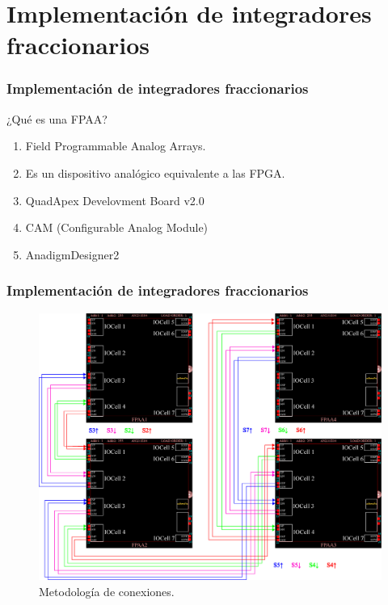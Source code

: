 \documentclass[10pt]{beamer}
\begin{document}
	\section{Implementación de integradores fraccionarios}
	\begin{frame}
		\frametitle{Implementación de integradores fraccionarios}
		\begin{block}{¿Qué es una FPAA?}
			\begin{enumerate}
				\item Field Programmable Analog Arrays.
				\item Es un dispositivo analógico equivalente a las FPGA.
				\item QuadApex Develovment Board v2.0
				\item CAM (Configurable Analog Module)
				\item AnadigmDesigner2
			\end{enumerate}
		\end{block}
	\end{frame}
	\begin{frame}
		\frametitle{Implementación de integradores fraccionarios}
			\begin{figure}[hbtp]
			\caption{Metodología de conexiones.}
			\centering
			\includegraphics[width=0.8\textheight]{../imagenes/X6_conexiones_AD2.eps}
			\end{figure}
	\end{frame}
\end{document}
